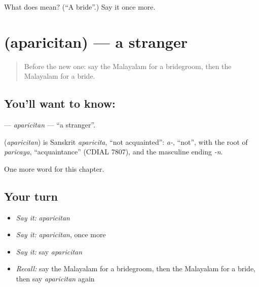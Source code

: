 \begin{tcolorbox}[breakable,colback=teal!4,colframe=teal!35!black,title={Before you move on}]
What does  mean? (\textquotedblleft{}A bride\textquotedblright{}.) Say it once more.
\end{tcolorbox}
\section[\texorpdfstring{\ml{അപരിചിതൻ} (aparicitan)}{അപരിചിതൻ (aparicitan)}]{ (aparicitan) — a stranger}

\label{lesson:ML-C211-aparicitan}



\begin{quote}
Before the new one: say the Malayalam for a bridegroom, then the Malayalam for a bride.
\end{quote}

\subsection*{You'll want to know: }
\textbf{} — \emph{aparicitan} — \textquotedblleft{}a stranger\textquotedblright{}.

\begin{cousinweb}
\textbf{} (\emph{aparicitan}) is Sanskrit \emph{aparicita}, \textquotedblleft{}not acquainted\textquotedblright{}: \emph{a-}, \textquotedblleft{}not\textquotedblright{}, with the root of \emph{paricaya}, \textquotedblleft{}acquaintance\textquotedblright{} (CDIAL 7807), and the masculine ending \emph{-n}.
\end{cousinweb}

\begin{grammarlens}[title={What you've built}]
One more word for this chapter.
\end{grammarlens}

\subsection*{Your turn}
\begin{itemize}
\raggedright
  \item \emph{Say it:} \emph{aparicitan}
  \item \emph{Say it:} \emph{aparicitan}, once more
  \item \emph{Say it:} say \emph{aparicitan}
  \item \emph{Recall:} say the Malayalam for a bridegroom, then the Malayalam for a bride, then say \emph{aparicitan} again
\end{itemize}


